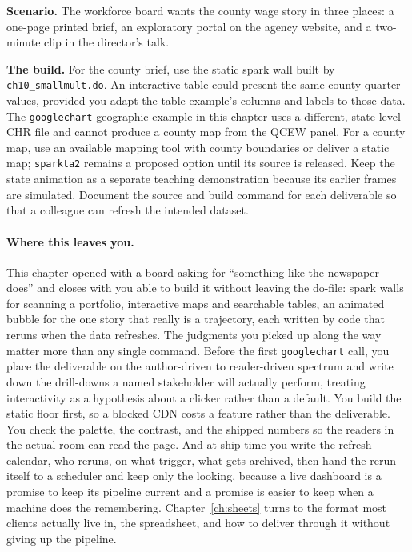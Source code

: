\documentclass[
    a4paper,
    fontsize=10pt,
    twoside=true,
    numbers=noenddot,
]{kaobook}
\newcounter{appliedexample}
\newenvironment{appliedexample}[1][]{%
    \refstepcounter{appliedexample}%
    \begin{appliedexamplebox}[frametitle={Applied Example~\theappliedexample.~~#1}]%
}{%
    \end{appliedexamplebox}%
}
\begin{document}
\begin{appliedexample}[One dataset, three deliverables]\label{ae:ch10-threedeliv}
\textbf{Scenario.} The workforce board wants the county wage story in three places: a one-page printed brief, an exploratory portal on the agency website, and a two-minute clip in the director's talk.

\medskip
\textbf{The build.} For the county brief, use the static spark wall built by \texttt{ch10\_smallmult.do}. An interactive table could present the same county-quarter values, provided you adapt the table example's columns and labels to those data. The \texttt{googlechart} geographic example in this chapter uses a different, state-level CHR file and cannot produce a county map from the QCEW panel. For a county map, use an available mapping tool with county boundaries or deliver a static map; \texttt{sparkta2} remains a proposed option until its source is released. Keep the state animation as a separate teaching demonstration because its earlier frames are simulated. Document the source and build command for each deliverable so that a colleague can refresh the intended dataset.
\end{appliedexample}

\paragraph{Where this leaves you.} This chapter opened with a board asking for \enquote{something like the newspaper does} and closes with you able to build it without leaving the do-file: spark walls for scanning a portfolio, interactive maps and searchable tables, an animated bubble for the one story that really is a trajectory, each written by code that reruns when the data refreshes. The judgments you picked up along the way matter more than any single command. Before the first \texttt{googlechart} call, you place the deliverable on the author-driven to reader-driven spectrum and write down the drill-downs a named stakeholder will actually perform, treating interactivity as a hypothesis about a clicker rather than a default. You build the static floor first, so a blocked CDN costs a feature rather than the deliverable. You check the palette, the contrast, and the shipped numbers so the readers in the actual room can read the page. And at ship time you write the refresh calendar, who reruns, on what trigger, what gets archived, then hand the rerun itself to a scheduler and keep only the looking, because a live dashboard is a promise to keep its pipeline current and a promise is easier to keep when a machine does the remembering. Chapter~\ref{ch:sheets} turns to the format most clients actually live in, the spreadsheet, and how to deliver through it without giving up the pipeline.
\end{document}
